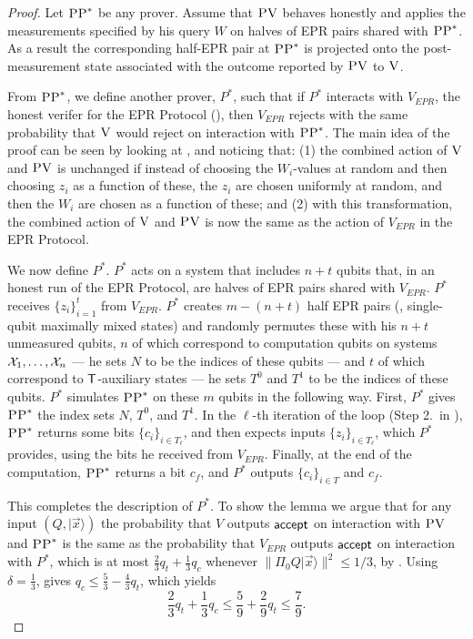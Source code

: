 \documentclass{toc}
\newcommand{\ket}[1]{|#1\rangle}
\newcommand{\ver}{\textsc{V}}
\newcommand{\pv}{\textsc{PV}}
\newcommand{\pp}{\textsc{PP}}
\begin{document}
\begin{proof}
Let $\pp^*$ be any prover. Assume that $\pv$ behaves honestly and applies the measurements specified by his query $W$ on halves of EPR pairs shared with $\pp^*$. As a result the corresponding half-EPR pair at $\pp^*$ is projected onto the post-measurement state associated with the outcome reported by $\pv$ to $\ver$. 


From $\pp^*$, we define another prover, $P^*$, such that if $P^*$ interacts with $V_{EPR}$,  the honest verifer for the EPR Protocol (), then $V_{EPR}$ rejects with the same probability that $\ver$ would reject on interaction with $\pp^*$. The main idea of the proof can be seen by looking at , and noticing that: (1) the combined action of $\ver$ and $\pv$ is unchanged if instead of choosing the $W_i$-values at random and then choosing $z_i$ as a function of these, the $z_i$ are chosen uniformly at random, and then the $W_i$ are chosen as a function of these; and (2) with this transformation, the combined action of $\ver$ and $\pv$ is now the same as the action of $V_{EPR}$ in the EPR Protocol. 

We now define $P^*$. $P^*$ acts on a system that includes $n+t$ qubits that, in an honest run of the EPR Protocol, are halves of EPR pairs shared with $V_{EPR}$. $P^*$ receives $\{{z}_i\}_{i=1}^t$ from $V_{EPR}$. $P^*$ creates $m-(n+t)$ half EPR pairs (\ie, single-qubit maximally mixed states) and randomly permutes these with his $n+t$ unmeasured qubits, $n$ of which correspond to computation qubits on systems ${\cal X}_1,\dots,{\cal X}_n$ --- he sets $N$ to be the indices of these qubits --- and $t$ of which correspond to $\sf T$-auxiliary states --- he sets $T^0$ and $T^1$ to be the indices of these qubits. $P^*$ simulates $\pp^*$ on these $m$ qubits in the following way. First, $P^*$ gives $\pp^*$ the index sets $N$, $T^0$, and $T^1$. In the $\ell$-th iteration of the loop (Step 2.\ in ), $\pp^*$ returns some bits $\{c_i\}_{i\in T_\ell}$, and then expects inputs $\{z_i\}_{i\in T_\ell}$, which $P^*$ provides, using the bits he received from $V_{EPR}$. Finally, at the end of the computation, $\pp^*$ returns a bit $c_f$, and $P^*$ outputs $\{c_i\}_{i\in T}$ and ${c_f}$. 

This completes the description of $P^*$. To show the lemma we argue that for any input $(Q,\ket{\vec{x}})$ the probability that $V$ outputs $\sf accept$ on interaction with $\pv$ and $\pp^*$ is the same as the probability that $V_{EPR}$ outputs $\sf accept$ on interaction with $P^*$, which is at most $\frac{2}{3}q_t+\frac{1}{3}q_c$ whenever $\|\Pi_0 Q \ket{\vec{x}}\|^2 \leq 1/3$, by . Using $\delta=\frac{1}{3}$,  gives $q_c\leq \frac{5}{3}-\frac{4}{3}q_t$, which yields
$$\frac{2}{3}q_t+\frac{1}{3}q_c\leq \frac{5}{9}+\frac{2}{9}q_t\leq \frac{7}{9}.$$



\end{proof}
\end{document}
